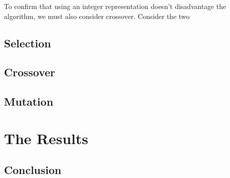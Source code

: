 \documentclass[]{report}
\begin{document}
To confirm that using an integer representation doesn't disadvantage the algorithm, we must also consider crossover. Consider the two 

\section{Selection}

\section{Crossover}

\section{Mutation}

\chapter{The Results}

\section{Conclusion}


\end{document}
